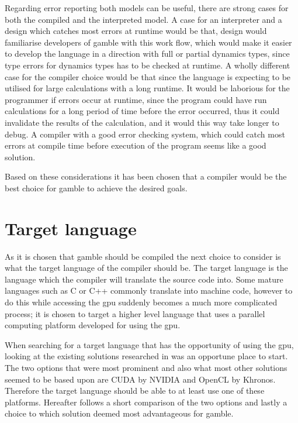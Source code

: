 Regarding error reporting both models can be useful, there are strong cases for both the compiled and the interpreted model.
A case for an interpreter and a design which catches most errors at runtime would be that, design would familiarise developers of \gls{gamble} with this work flow, which would make it easier to develop the language in a direction with full or partial dynamics types, since type errors for dynamics types has to be checked at runtime. 
A wholly different case for the compiler choice would be that since the language is expecting to be utilised for large calculations with a long runtime.
It would be laborious for the programmer if errors occur at runtime, since the program could have run calculations for a long period of time before the error occurred, thus it could invalidate the results of the calculation, and it would this way take longer to debug.
A compiler with a good error checking system, which could catch most errors at compile time before execution of the program seems like a good solution. \citep{Sebesta, Crafting_book}

Based on these considerations it has been chosen that a compiler would be the best choice for \gls{gamble} to achieve the desired goals.

\section{Target language}\label{CUDAvsOpenCL}
As it is chosen that \gls{gamble} should be compiled the next choice to consider is what the target language of the compiler should be.
The target language is the language which the compiler will translate the source code into.
Some mature languages such as C or C++ commonly translate into machine code, however to do this while accessing the \acrshort{gpu} suddenly becomes a much more complicated process; it is chosen to target a higher level language that uses a parallel computing platform developed for using the \acrshort{gpu}.

When searching for a target language that has the opportunity of using the \acrshort{gpu}, looking at the existing solutions researched in  was an opportune place to start.
The two options that were most prominent and also what most other solutions seemed to be based upon are CUDA by NVIDIA and OpenCL by Khronos.
Therefore the target language should be able to at least use one of these platforms. 
Hereafter follows a short comparison of the two options and lastly a choice to which solution deemed most advantageous for \gls{gamble}.

